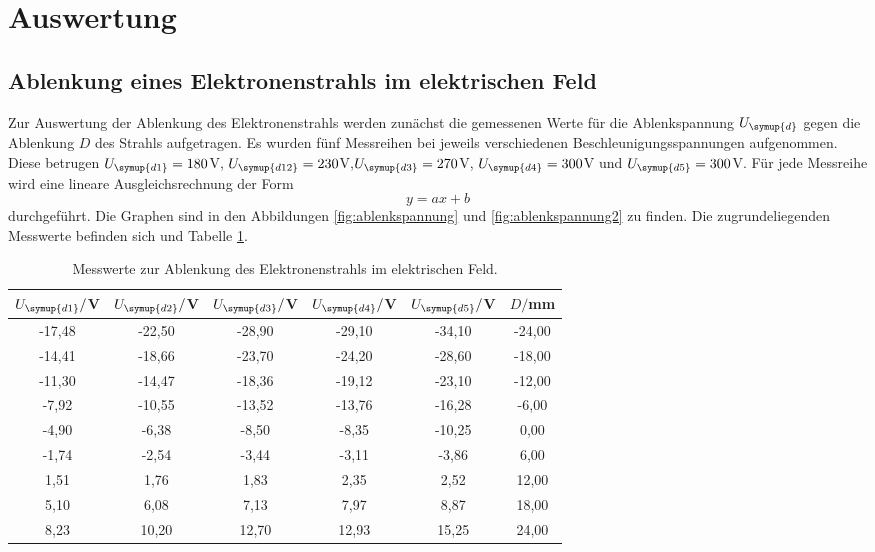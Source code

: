 \section{Auswertung}
\label{sec:Auswertung}


\subsection{Ablenkung eines Elektronenstrahls im elektrischen Feld}
\label{subsec:efeld}


Zur Auswertung der Ablenkung des Elektronenstrahls werden zunächst die gemessenen Werte
für die Ablenkspannung $U_{\symup{d}}$ gegen die Ablenkung $D$ des Strahls aufgetragen.
Es wurden fünf Messreihen bei jeweils verschiedenen Beschleunigungsspannungen aufgenommen.
Diese betrugen $U_{\symup{d1}}=180$V, $U_{\symup{d12}}=230$V,$U_{\symup{d3}}=270$V,
$U_{\symup{d4}}=300$V und $U_{\symup{d5}}=300$V.
Für jede Messreihe wird eine lineare Ausgleichsrechnung der Form
\begin{equation*}
  y=a x + b
\end{equation*}
durchgeführt. Die Graphen sind in den Abbildungen \ref{fig:ablenkspannung} und
\ref{fig:ablenkspannung2} zu finden. Die zugrundeliegenden Messwerte befinden sich
und Tabelle \ref{tab:elektrisch}.

\begin{table}[htp]
	\begin{center}
    \caption{Messwerte zur Ablenkung des Elektronenstrahls im elektrischen Feld.}
    \label{tab:elektrisch}
		\begin{tabular}{cccccc}
		\toprule
			{$U_{\symup{d1}}/$V} & {$U_{\symup{d2}}/$V} & {$U_{\symup{d3}}/$V} & {$U_{\symup{d4}}/$V} & {$U_{\symup{d5}}/$V} & {$D/$mm}\\
			\midrule
			-17,48 & -22,50 & -28,90 & -29,10 & -34,10 & -24,00\\
			-14,41 & -18,66 & -23,70 & -24,20 & -28,60 & -18,00\\
			-11,30 & -14,47 & -18,36 & -19,12 & -23,10 & -12,00\\
			-7,92 & -10,55 & -13,52 & -13,76 & -16,28 & -6,00\\
			-4,90 & -6,38 & -8,50 & -8,35 & -10,25 & 0,00\\
			-1,74 & -2,54 & -3,44 & -3,11 & -3,86 & 6,00\\
			1,51 & 1,76 & 1,83 & 2,35 & 2,52 & 12,00\\
			5,10 & 6,08 & 7,13 & 7,97 & 8,87 & 18,00\\
			8,23 & 10,20 & 12,70 & 12,93 & 15,25 & 24,00\\
		\bottomrule
		\end{tabular}
	\end{center}
\end{table}

